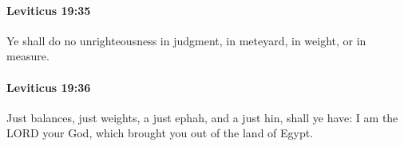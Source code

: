 		\paragraph{Leviticus 19:35} %
			\label{LEVITICUS-19-35}

			Ye shall do no unrighteousness in judgment, in meteyard, in weight, or in measure.


		\paragraph{Leviticus 19:36} %
			\label{LEVITICUS-19-36}

			Just balances, just weights, a just ephah, and a just hin, shall ye have: I am the LORD your God, which brought you out of the land of Egypt.


